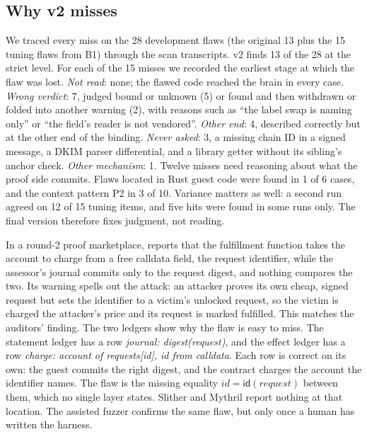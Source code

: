 
\subsection{Why \tool{} v2 misses}\label{sec:eval-misses}

We traced every miss on the 28 development flaws (the original 13 plus the 15
tuning flaws from B1) through the scan transcripts. v2 finds 13 of the 28 at
the strict level. For each of the 15 misses we recorded the earliest stage at which the flaw
was lost. \emph{Not read}: none; the flawed code reached the brain in every
case. \emph{Wrong verdict}: 7, judged bound or unknown (5) or found and then
withdrawn or folded into another warning (2), with reasons such as ``the label
swap is naming only'' or ``the field's reader is not vendored''. \emph{Other
end}: 4, described correctly but at the other end of the binding.
\emph{Never asked}: 3, a missing chain ID in a signed message, a DKIM parser
differential, and a library getter without its sibling's anchor check.
\emph{Other mechanism}: 1. Twelve misses need reasoning about what the proof side commits. Flaws located
in Rust guest code were found in 1 of 6 cases, and the context pattern P2 in 3
of 10. Variance matters as well: a second run agreed on 12 of 15 tuning items,
and five hits were found in some runs only.
The final version therefore fixes judgment, not reading.

In a round-2 proof marketplace, \tool{} reports that the fulfillment
function takes the account to charge from a free calldata field, the request
identifier, while the assessor's journal commits only to the request digest,
and nothing compares the two. Its warning spells out the attack: an attacker
proves its own cheap, signed request but sets the identifier to a victim's
unlocked request, so the victim is charged the attacker's price and its
request is marked fulfilled. This matches the auditors' finding. The two
ledgers show why the flaw is easy to miss. The statement ledger has a row
\emph{journal: digest(request)}, and the effect ledger has a row
\emph{charge: account of requests[id], id from calldata}. Each row is correct
on its own: the guest commits the right digest, and the contract charges the
account the identifier names. The flaw is the missing equality
$\mathit{id} = \mathsf{id}(\mathit{request})$ between them, which no single
layer states. Slither and Mythril report nothing at that location. The
assisted fuzzer confirms the same flaw, but only once a human has written
the harness.


